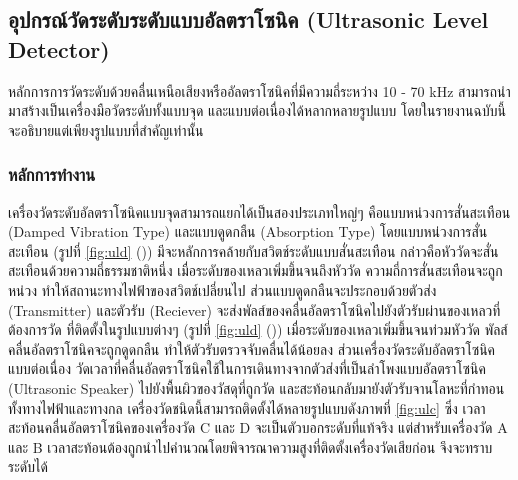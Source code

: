 \documentclass[final,11pt,a4paper]{article}
\begin{document}
\subsection{อุปกรณ์วัดระดับระดับแบบอัลตราโซนิค (Ultrasonic Level Detector)}
หลักการการวัดระดับด้วยคลื่นเหนือเสียงหรืออัลตราโซนิคที่มีความถี่ระหว่าง 10 - 70 kHz สามารถนำมาสร้างเป็นเครื่องมือวัดระดับทั้งแบบจุด 
และแบบต่อเนื่องได้หลากหลายรูปแบบ โดยในรายงานฉบับนี้จะอธิบายแต่เพียงรูปแบบที่สำคัญเท่านั้น
\subsubsection{หลักการทำงาน}
เครื่องวัดระดับอัลตราโซนิคแบบจุดสามารถแยกได้เป็นสองประเภทใหญ่ๆ คือแบบหน่วงการสั่นสะเทือน (Damped Vibration Type)
และแบบดูดกลืน (Absorption Type) โดยแบบหน่วงการสั่นสะเทือน (รูปที่ \ref{fig:uld} ()) มีจะหลักการคล้ายกับสวิตช์ระดับแบบสั่นสะเทือน 
กล่าวคือหัววัดจะสั่นสะเทือนด้วยความถี่ธรรมชาติหนึ่ง เมื่อระดับของเหลวเพิ่มขึ้นจนถึงหัววัด ความถี่การสั่นสะเทือนจะถูกหน่วง ทำให้สถานะทางไฟฟ้าของสวิตช์เปลี่ยนไป 
ส่วนแบบดูดกลืนจะประกอบด้วยตัวส่ง (Transmitter) และตัวรับ (Reciever) จะส่งพัลส์ของคลื่นอัลตราโซนิคไปยังตัวรับผ่านของเหลวที่ต้องการวัด 
ที่ติดตั้งในรูปแบบต่างๆ (รูปที่ \ref{fig:uld} ()) เมื่อระดับของเหลวเพิ่มขึ้นจนท่วมหัววัด พัลส์คลื่นอัลตราโซนิคจะถูกดูดกลืน ทำให้ตัวรับตรวจจับคลื่นได้น้อยลง 
ส่วนเครื่องวัดระดับอัลตราโซนิคแบบต่อเนื่อง วัดเวลาที่คลื่นอัลตราโซนิคใช้ในการเดินทางจากตัวส่งที่เป็นลำโพงแบบอัลตราโซนิค (Ultrasonic Speaker)
ไปยังพื้นผิวของวัสดุที่ถูกวัด และสะท้อนกลับมายังตัวรับจานโลหะที่กำทอนทั้งทางไฟฟ้าและทางกล เครื่องวัดชนิดนี้สามารถติดตั้งได้หลายรูปแบบดังภาพที่ \ref{fig:ulc} ซึ่ง
เวลาสะท้อนคลื่นอัลตราโซนิคของเครื่องวัด C และ D จะเป็นตัวบอกระดับที่แท้จริง แต่สำหรับเครื่องวัด A และ B 
เวลาสะท้อนต้องถูกนำไปคำนวณโดยพิจารณาความสูงที่ติดตั้งเครื่องวัดเสียก่อน จึงจะทราบระดับได้
\end{document}
